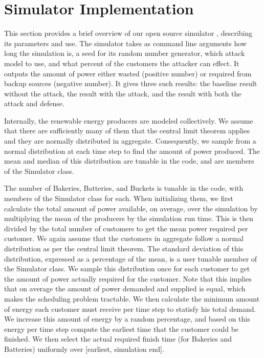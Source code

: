 \documentclass[conference]{IEEEtran}
\begin{document}
\section{Simulator Implementation}
\label{Simulation}

This section provides a brief overview of our open source simulator \cite{gridsec}, describing its parameters and use.  The simulator takes as command line arguments how long the simulation is, a seed for its random number generator, which attack model to use, and what percent of the customers the attacker can effect.  It outputs the amount of power either wasted (positive number) or required from backup sources (negative number).  It gives three such results: the baseline result without the attack, the result with the attack, and the result with both the attack and defense.

Internally, the renewable energy producers are modeled collectively.  We assume that there are sufficiently many of them that the central limit theorem applies and they are normally distributed in aggregate.  Consequently, we sample from a normal distribution at each time step to find the amount of power produced.  The mean and median of this distribution are tunable in the code, and are members of the Simulator class.

The number of Bakeries, Batteries, and Buckets is tunable in the code, with members of the Simulator class for each.  When initializing them, we first calculate the total amount of power available, on average, over the simulation by multiplying the mean of the producers by the simulation run time.  This is then divided by the total number of customers to get the mean power required per customer.  We again assume that the customers in aggregate follow a normal distribution as per the central limit theorem.  The standard deviation of this distribution, expressed as a percentage of the mean, is a user tunable member of the Simulator class.  We sample this distribution once for each customer to get the amount of power actually required for the customer.  Note that this implies that on average the amount of power demanded and supplied is equal, which makes the scheduling problem tractable.  We then calculate the minimum amount of energy each customer must receive per time step to statisfy his total demand. We increase this amount of energy by a random percentage, and based on this energy per time step compute the earliest time that the customer could be finished.   We then select the actual required finish time (for Bakeries and Batteries) uniformly over [earliest, simulation end].  
\end{document}

